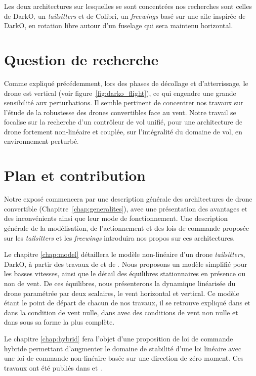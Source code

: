 Les deux architectures sur lesquelles se sont concentrées nos recherches sont celles de DarkO, un \textit{tailsitters} et de Colibri, un \textit{freewings} basé sur une aile inspirée de DarkO, en rotation libre autour d'un fuselage qui sera maintenu horizontal.


\section*{Question de recherche}
{\color{red}
Comme expliqué précédemment, lors des phases de décollage et d'atterrissage, le drone est vertical (voir figure~\ref{fig:darko_flight}), ce qui engendre une grande sensibilité aux perturbations. Il semble pertinent de concentrer nos travaux sur l'étude de la robustesse des drones convertibles face au vent.
Notre travail se focalise sur la recherche d'un contrôleur de vol unifié, pour une architecture de drone fortement non-linéaire et couplée, sur l'intégralité du domaine de vol, en environnement perturbé.
}

\section*{Plan et contribution}
Notre exposé commencera par une description générale des architectures de drone convertible (Chapitre~\ref{chap:generalites}), avec une présentation des avantages et des inconvénients ainsi que leur mode de fonctionnement. Une description générale de la modélisation, de l'actionnement et des lois de commande proposée sur les \textit{tailsitters} et les \textit{freewings} introduira nos propos sur ces architectures.

Le chapitre \ref{chap:model} détaillera le modèle non-linéaire d'un drone \textit{tailsitters}, DarkO, à partir des travaux de \cite{lustosaHal-03035938} et de \cite{olszaneckibarthHal-02542982}. Nous proposons un modèle simplifié pour les basses vitesses, ainsi que le détail des équilibres stationnaires en présence ou non de vent. De ces équilibres, nous présenterons la dynamique linéarisée du drone paramétrée par deux scalaires, le vent horizontal et vertical. Ce modèle étant le point de départ de chacun de nos travaux, il se retrouve expliqué dans \cite[Chapitre 2]{sansouStage} et \cite[Section II]{sansouECC} dans la condition de vent nulle, dans \cite[Section 2]{SANSOUACA} avec des conditions de vent non nulle et dans \cite[Section II]{sansouTCST} sous sa forme la plus complète.

Le chapitre \ref{chap:hybrid} fera l'objet d'une proposition de loi de commande hybride permettant d'augmenter le domaine de stabilité d'une loi linéaire avec une loi de commande non-linéaire basée sur une direction de zéro moment. Ces travaux ont été publiés dans  \cite{sansouStage} et \cite{sansouECC}.

